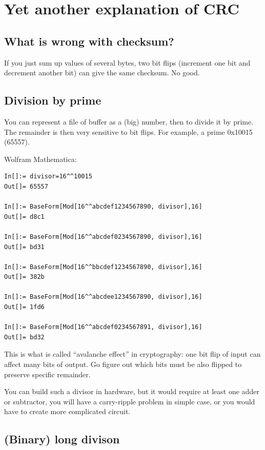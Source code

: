 \section{Yet another explanation of \ac{CRC}}

\subsection{What is wrong with checksum?}

If you just sum up values of several bytes, two bit flips (increment one bit and decrement another bit) can
give the same checksum.
No good.

\subsection{Division by prime}

You can represent a file of buffer as a (big) number, then to divide it by prime.
The remainder is then very sensitive to bit flips.
For example, a prime 0x10015 (65557).

Wolfram Mathematica:

\begin{lstlisting}
In[]:= divisor=16^^10015
Out[]= 65557

In[]:= BaseForm[Mod[16^^abcdef1234567890, divisor],16]
Out[]= d8c1

In[]:= BaseForm[Mod[16^^abcdef0234567890, divisor],16]
Out[]= bd31

In[]:= BaseForm[Mod[16^^bbcdef1234567890, divisor],16]
Out[]= 382b

In[]:= BaseForm[Mod[16^^abcdee1234567890, divisor],16]
Out[]= 1fd6

In[]:= BaseForm[Mod[16^^abcdef0234567891, divisor],16]
Out[]= bd32
\end{lstlisting}

This is what is called ``avalanche effect'' in cryptography: one bit flip of input can affect many bits of output.
Go figure out which bits must be also flipped to preserve specific remainder.

You can build such a divisor in hardware, but it would require at least one adder or subtractor, you will have
a carry-ripple problem in simple case, or you would have to create more complicated circuit.

\subsection{(Binary) long divison}

